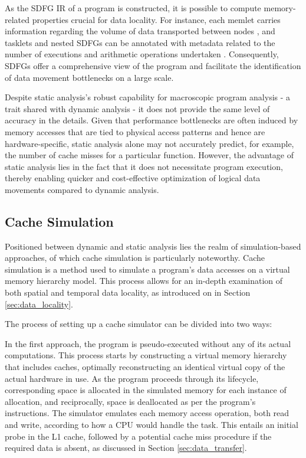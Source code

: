 As the SDFG IR of a program is constructed, it is possible to compute memory-related properties crucial for data locality. For instance, each memlet carries information regarding the volume of data transported between nodes \cite{ben2019statefulSDFG}, and tasklets and nested SDFGs can be annotated with metadata related to the number of executions and arithmetic operations undertaken \cite{schaad2021boosting}. Consequently, SDFGs offer a comprehensive view of the program and facilitate the identification of data movement bottlenecks on a large scale.

Despite static analysis's robust capability for macroscopic program analysis - a trait shared with dynamic analysis - it does not provide the same level of accuracy in the details. Given that performance bottlenecks are often induced by memory accesses that are tied to physical access patterns and hence are hardware-specific, static analysis alone may not accurately predict, for example, the number of cache misses for a particular function. However, the advantage of static analysis lies in the fact that it does not necessitate program execution, thereby enabling quicker and cost-effective optimization of logical data movements compared to dynamic analysis.

\subsection{Cache Simulation}\label{sec:simulation}

Positioned between dynamic and static analysis lies the realm of simulation-based approaches, of which cache simulation is particularly noteworthy. Cache simulation is a method used to simulate a program's data accesses on a virtual memory hierarchy model. This process allows for an in-depth examination of both spatial and temporal data locality, as introduced on in Section \ref{sec:data_locality}.

The process of setting up a cache simulator can be divided into two ways:

In the first approach, the program is pseudo-executed without any of its actual computations. This process starts by constructing a virtual memory hierarchy that includes caches, optimally reconstructing an identical virtual copy of the actual hardware in use. As the program proceeds through its lifecycle, corresponding space is allocated in the simulated memory for each instance of allocation, and reciprocally, space is deallocated as per the program's instructions. The simulator emulates each memory access operation, both read and write, according to how a CPU would handle the task. This entails an initial probe in the L1 cache, followed by a potential cache miss procedure if the required data is absent, as discussed in Section \ref{sec:data_transfer}.

